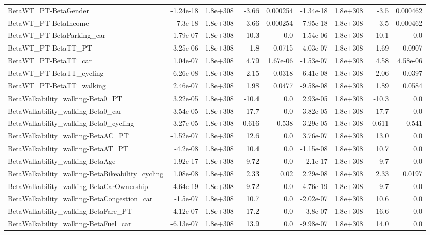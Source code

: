 \begin{tabular}{lrrrrrrrr}
BetaWT_PT-BetaGender & -1.24e-18 & 1.8e+308 & -3.66 & 0.000254 & -1.34e-18 & 1.8e+308 & -3.5 & 0.000462 \\
BetaWT_PT-BetaIncome & -7.3e-18 & 1.8e+308 & -3.66 & 0.000254 & -7.95e-18 & 1.8e+308 & -3.5 & 0.000462 \\
BetaWT_PT-BetaParking_car & -1.79e-07 & 1.8e+308 & 10.3 & 0.0 & -1.54e-06 & 1.8e+308 & 10.1 & 0.0 \\
BetaWT_PT-BetaTT_PT & 3.25e-06 & 1.8e+308 & 1.8 & 0.0715 & -4.03e-07 & 1.8e+308 & 1.69 & 0.0907 \\
BetaWT_PT-BetaTT_car & 1.04e-07 & 1.8e+308 & 4.79 & 1.67e-06 & -1.53e-07 & 1.8e+308 & 4.58 & 4.58e-06 \\
BetaWT_PT-BetaTT_cycling & 6.26e-08 & 1.8e+308 & 2.15 & 0.0318 & 6.41e-08 & 1.8e+308 & 2.06 & 0.0397 \\
BetaWT_PT-BetaTT_walking & 2.46e-07 & 1.8e+308 & 1.98 & 0.0477 & -9.58e-08 & 1.8e+308 & 1.89 & 0.0584 \\
BetaWalkability_walking-Beta0_PT & 3.22e-05 & 1.8e+308 & -10.4 & 0.0 & 2.93e-05 & 1.8e+308 & -10.3 & 0.0 \\
BetaWalkability_walking-Beta0_car & 3.54e-05 & 1.8e+308 & -17.7 & 0.0 & 3.82e-05 & 1.8e+308 & -17.7 & 0.0 \\
BetaWalkability_walking-Beta0_cycling & 3.27e-05 & 1.8e+308 & -0.616 & 0.538 & 3.29e-05 & 1.8e+308 & -0.611 & 0.541 \\
BetaWalkability_walking-BetaAC_PT & -1.52e-07 & 1.8e+308 & 12.6 & 0.0 & 3.76e-07 & 1.8e+308 & 13.0 & 0.0 \\
BetaWalkability_walking-BetaAT_PT & -4.2e-08 & 1.8e+308 & 10.4 & 0.0 & -1.15e-08 & 1.8e+308 & 10.7 & 0.0 \\
BetaWalkability_walking-BetaAge & 1.92e-17 & 1.8e+308 & 9.72 & 0.0 & 2.1e-17 & 1.8e+308 & 9.7 & 0.0 \\
BetaWalkability_walking-BetaBikeability_cycling & 1.08e-08 & 1.8e+308 & 2.33 & 0.02 & 2.29e-08 & 1.8e+308 & 2.33 & 0.0197 \\
BetaWalkability_walking-BetaCarOwnership & 4.64e-19 & 1.8e+308 & 9.72 & 0.0 & 4.76e-19 & 1.8e+308 & 9.7 & 0.0 \\
BetaWalkability_walking-BetaCongestion_car & -1.5e-07 & 1.8e+308 & 10.7 & 0.0 & -2.02e-07 & 1.8e+308 & 10.6 & 0.0 \\
BetaWalkability_walking-BetaFare_PT & -4.12e-07 & 1.8e+308 & 17.2 & 0.0 & 3.8e-07 & 1.8e+308 & 16.6 & 0.0 \\
BetaWalkability_walking-BetaFuel_car & -6.13e-07 & 1.8e+308 & 13.9 & 0.0 & -9.98e-07 & 1.8e+308 & 14.0 & 0.0 \\

\end{tabular}
